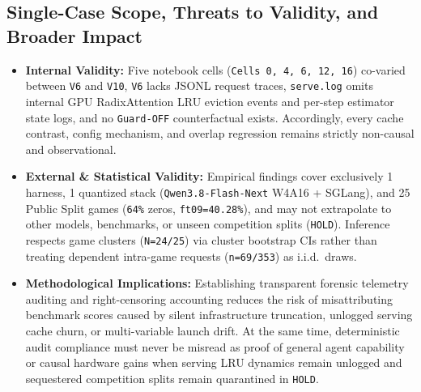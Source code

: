 \documentclass[10pt]{article}
\newcommand{\code}[1]{\texttt{#1}}
\begin{document}
\subsection{Single-Case Scope, Threats to Validity, and Broader Impact}
\begin{itemize}[leftmargin=1.4em,itemsep=2pt]
\item \textbf{Internal Validity:} Five notebook cells (\code{Cells 0, 4, 6, 12, 16}) co-varied between \code{V6} and \code{V10}, \code{V6} lacks JSONL request traces, \code{serve.log} omits internal GPU RadixAttention LRU eviction events and per-step estimator state logs, and no \code{Guard-OFF} counterfactual exists. Accordingly, every cache contrast, config mechanism, and overlap regression remains strictly non-causal and observational.
\item \textbf{External \& Statistical Validity:} Empirical findings cover exclusively 1 harness, 1 quantized stack (\code{Qwen3.8-Flash-Next} W4A16 + SGLang), and 25 Public Split games (\code{64\%} zeros, \code{ft09=40.28\%}), and may not extrapolate to other models, benchmarks, or unseen competition splits (\code{HOLD}). Inference respects game clusters (\code{N=24/25}) via cluster bootstrap CIs rather than treating dependent intra-game requests (\code{n=69/353}) as i.i.d.\ draws.
\item \textbf{Methodological Implications:} Establishing transparent forensic telemetry auditing and right-censoring accounting reduces the risk of misattributing benchmark scores caused by silent infrastructure truncation, unlogged serving cache churn, or multi-variable launch drift. At the same time, deterministic audit compliance must never be misread as proof of general agent capability or causal hardware gains when serving LRU dynamics remain unlogged and sequestered competition splits remain quarantined in \code{HOLD}.
\end{itemize}
\end{document}

